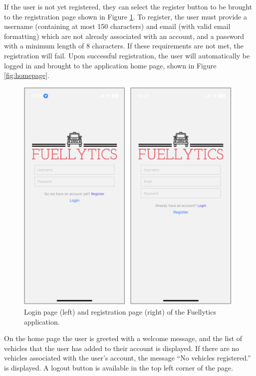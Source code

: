 \documentclass[11pt, oneside]{article}
\begin{document}
If the user is not yet registered, they can select the register button to be brought to the registration page shown in Figure \ref{fig:login-register}.  To register, the user must provide a username (containing at most 150 characters) and email (with valid email formatting) which are not already associated with an account, and a password with a minimum length of 8 characters.  If these requirements are not met, the registration will fail. Upon successful registration, the user will automatically be logged in and brought to the application home page, shown in Figure \ref{fig:homepage}.
\begin{figure}[H]
\centerline{\includegraphics[width=11cm]{img/login-register.png}}
\caption{\label{fig:login-register}Login page (left) and registration page (right) of the Fuellytics application.}
\end{figure}

On the home page the user is greeted with a welcome message, and the list of vehicles that the user has added to their account is displayed.  If there are no vehicles associated with the user's account, the message ``No vehicles registered.'' is displayed.  A logout button is available in the top left corner of the page.
\end{document}
